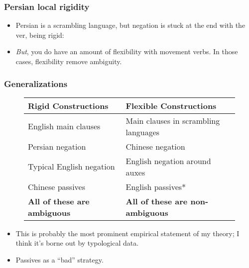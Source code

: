 \documentclass[aspectratio=169]{beamer}
\begin{document}
\begin{frame}
	\frametitle{Persian local rigidity}\pause

	\begin{itemize}
		\item Persian is a scrambling language, but negation is stuck at the end with the ver, being rigid:\pause

\begin{exe}
\end{exe}\pause
	\item \emph{But}, you do have an amount of flexibility with movement verbs. In those cases, flexibility remove ambiguity.\pause

\begin{exe}
\pause
{}
\end{exe}
	\end{itemize}
\end{frame}

\begin{frame}
	\frametitle{Generalizations}\pause

\begin{figure}
\begin{tabular}{ll}
	Rigid Constructions & Flexible Constructions \\\hline\hline\pause
	English main clauses & Main clauses in scrambling languages \\\pause
	Persian negation & Chinese negation \\\pause
	Typical English negation & English negation around auxes \\\pause
	Chinese passives & English passives*\\\pause
	\textbf{All of these are ambiguous} & \textbf{All of these are non-ambiguous}\\
\end{tabular}\pause
\end{figure}

	\begin{itemize}
		\item This is probably the most prominent empirical statement of my theory; I think it's borne out by typological data.\pause
		\item Passives as a ``bad'' strategy.
	\end{itemize}
\end{frame}
\end{document}
